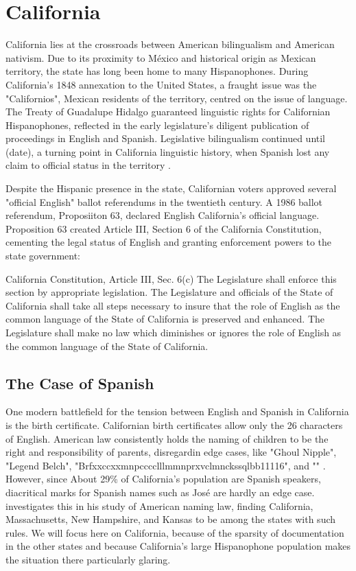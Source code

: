\section{California}

California lies at the crossroads between American bilingualism and American
nativism. Due to its proximity to México and historical origin as Mexican
territory, the state has long been home to many Hispanophones.  During
California's 1848 annexation to the United States, a fraught issue was the
"Californios", Mexican residents of the territory, centred on the issue of
language. The Treaty of Guadalupe Hidalgo guaranteed linguistic rights for
Californian Hispanophones, reflected in the early legislature's diligent
publication of proceedings in English and Spanish. Legislative bilingualism
continued until (date), a turning point in California linguistic history, when
Spanish lost any claim to official status in the territory \parencite{baron02}.

Despite the Hispanic presence in the state, Californian voters approved several
"official English" ballot referendums in the twentieth century. A 1986 ballot
referendum, Proposiiton 63, declared English California's official language.
Proposition 63 created Article III, Section 6 of the California Constitution,
cementing the legal status of English and granting enforcement powers to the
state government: 

\begin{aquote}{California Constitution, Article III, Sec. 6(c)}
	The Legislature shall enforce this section by appropriate legislation. The
	Legislature and officials of the State of California shall take all steps
	necessary to insure that the role of English as the common language of the
	State of California is preserved and enhanced. The Legislature shall make no
	law which diminishes or ignores the role of English as the common language of
	the State of California.
\end{aquote}


\subsection{The Case of Spanish}

One modern battlefield for the tension between English and Spanish in California
is the birth certificate. Californian birth certificates allow only the 26
characters of English. American law consistently holds the naming of children to
be the right and responsibility of parents, disregardin edge cases, like "Ghoul
Nipple", "Legend Belch", "Brfxxccxxmnpcccclllmmnprxvclmnckssqlbb11116", and ""
\parencite{larson11}.  However, since About 29\% of California's population are
Spanish speakers, diacritical marks for Spanish names such as José are hardly an
edge case. \textcite[5]{larson11} investigates this in his study of American
naming law, finding California, Massachusetts, New Hampshire, and Kansas to be
among the states with such rules. We will focus here on California, because of
the sparsity of documentation in the other states and because California's large
Hispanophone population makes the situation there particularly glaring.

